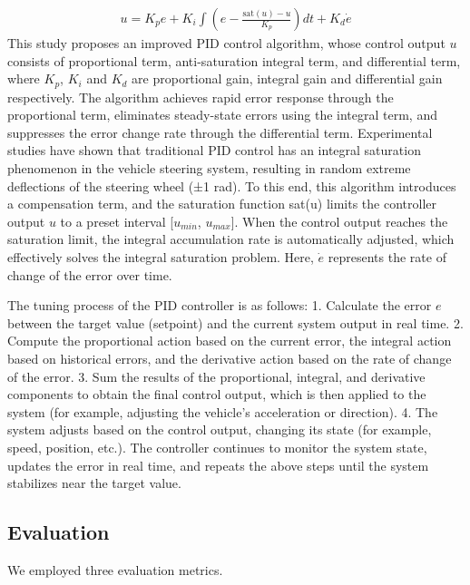 \documentclass[journal,twoside,web]{ieeecolor}
\begin{document}
\begin{align}
	u = K_p e + K_i \int \left( e - \frac{\text{sat}(u)-u}{K_p} \right) dt + K_d \dot{e}
\end{align}
This study proposes an improved PID control algorithm, whose control output \(u\) consists of proportional term, anti-saturation integral term, and differential term, where \(K_p\), \(K_i\) and \(K_d\) are proportional gain, integral gain and differential gain respectively.
The algorithm achieves rapid error response through the proportional term, eliminates steady-state errors using the integral term, and suppresses the error change rate through the differential term.
Experimental studies have shown that traditional PID control has an integral saturation phenomenon in the vehicle steering system, resulting in random extreme deflections of the steering wheel (±1 rad).
To this end, this algorithm introduces a compensation term, and the saturation function sat(u) limits the controller output \(u\) to a preset interval [\(u_{min}\), \(u_{max}\)].
When the control output reaches the saturation limit, the integral accumulation rate is automatically adjusted, which effectively solves the integral saturation problem.
Here, \(\dot{e}\) represents the rate of change of the error over time.

The tuning process of the PID controller is as follows:  
1. Calculate the error \(e\) between the target value (setpoint) and the current system output in real time.  
2. Compute the proportional action based on the current error, the integral action based on historical errors, and the derivative action based on the rate of change of the error.  
3. Sum the results of the proportional, integral, and derivative components to obtain the final control output, which is then applied to the system (for example, adjusting the vehicle's acceleration or direction). 
4. The system adjusts based on the control output, changing its state (for example, speed, position, etc.). 
The controller continues to monitor the system state, updates the error in real time, and repeats the above steps until the system stabilizes near the target value.


\subsection{Evaluation}

We employed three evaluation metrics.
\end{document}
